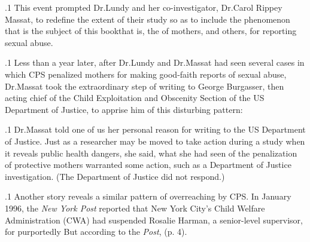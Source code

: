 \documentclass[11pt, twoside]{article}
\begin{document}
{\p.1{%
This event prompted Dr.\@ Lundy and her co-investigator, Dr.\@ Carol
Rippey Massat, to redefine the extent of their study so as to include the
phenomenon that is the subject of this book\mdash{}that is, the 
of mothers, and others, for reporting sexual abuse.
}%

\p.1{%
Less than a year later, after Dr.\@ Lundy and Dr.\@ Massat had seen
several cases in which CPS penalized mothers for making good-faith reports of sexual abuse, Dr.\@ Massat took the extraordinary step of writing
to George Burgasser, then acting chief of the Child Exploitation and
Obscenity Section of the US Department of Justice, to apprise him of
this disturbing pattern: 
}%

\p.1{%
Dr.\@ Massat told one of us her personal reason for writing to the US
Department of Justice. Just as a researcher may be moved to take action
during a study when it reveals public health dangers, she said, what she
had seen of the penalization of protective mothers warranted some action, such as a Department of Justice investigation. (The Department of
Justice did not respond.)
}%

\p.1{%
Another story reveals a similar pattern of overreaching by CPS.
In January 1996, the \textit{New York Post} reported that New York City's
Child Welfare Administration (CWA) had suspended Rosalie Harman,
a senior-level supervisor, for purportedly  But according to the \textit{Post},  (p. 4).
}%

}
\end{document}
